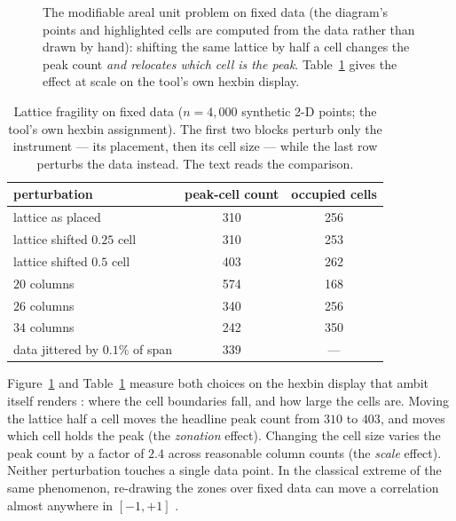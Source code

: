 \documentclass[11pt,letterpaper]{article}
\begin{document}
\begin{figure}[t]
\caption{The modifiable areal unit problem on fixed data (the diagram's
points and highlighted cells are computed from the data rather than drawn
by hand): shifting the same lattice by half a cell changes the peak count
\emph{and relocates which cell is the peak}. Table~\ref{tab:maup} gives
the effect at scale on the tool's own hexbin display.}
\label{fig:maup}
\end{figure}

\begin{table}[t]
\centering
\caption{Lattice fragility on fixed data ($n{=}4{,}000$ synthetic 2-D
points; the tool's own hexbin assignment). The first two blocks perturb
only the instrument --- its placement, then its cell size --- while the
last row perturbs the data instead. The text reads the comparison.}
\label{tab:maup}
\begin{tabular}{lcc}
\toprule
perturbation & peak-cell count & occupied cells\\
\midrule
lattice as placed & 310 & 256\\
lattice shifted $0.25$ cell & 310 & 253\\
lattice shifted $0.5$ cell & 403 & 262\\
\midrule
$20$ columns & 574 & 168\\
$26$ columns & 340 & 256\\
$34$ columns & 242 & 350\\
\midrule
data jittered by $0.1\%$ of span & 339 & ---\\
\bottomrule
\end{tabular}
\end{table}

Figure~\ref{fig:maup} and Table~\ref{tab:maup} measure both choices on the
hexbin display that \textsf{ambit} itself renders
\cite{openshaw1984}: where the cell boundaries fall,
and how large the cells are. Moving the lattice half a cell moves the
headline peak count from $310$ to $403$, and moves which cell holds the
peak (the \emph{zonation} effect). Changing the cell size varies the peak
count by a factor of $2.4$ across reasonable column counts (the
\emph{scale} effect). Neither perturbation touches a single data point. In
the classical extreme of the same phenomenon, re-drawing the zones over
fixed data can move a correlation almost anywhere in $[-1,+1]$
\cite{openshaw1979}.
\end{document}
